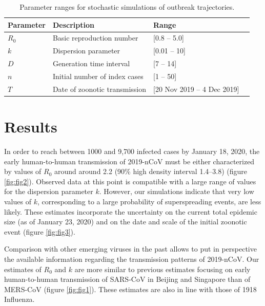 \documentclass{article}
\begin{document}
\begin{table}
	\centering
	\caption{Parameter ranges for stochastic simulations of outbreak trajectories.}
	\label{fig:tab1}
\begin{tabular}{llll}
	\hline
	Parameter & Description & Range   \\
	\hline 
	$R_0$& Basic reproduction number  &[0.8 -- 5.0] \\ 
	$k$ & Dispersion parameter & [0.01 -- 10] \\
	$D$ & Generation time interval & [7 -- 14]  \\
	$n$ & Initial number of index cases & [1 -- 50]  \\
	$T$ & Date of zoonotic transmission & [20 Nov 2019 -- 4 Dec 2019] \\
	
	\hline 
\end{tabular} 
\end{table}

\section{Results}
In order to reach between 1000 and 9,700 infected cases by January 18, 2020, the early human-to-human transmission of 2019-nCoV must be either characterized by values of $R_0$ around around 2.2 (90\% high density interval 1.4--3.8) (figure \ref{fig:fig2}).
Observed data at this point is compatible with a large range of values for the dispersion parameter $k$. 
However, our simulations indicate that very low values of $k$, corresponding to a large probability of superspreading events, are less likely.
These estimates incorporate the uncertainty on the current total epidemic size (as of January 23, 2020) and on the date and scale of the initial zoonotic event (figure \ref{fig:fig3}).

Comparison with other emerging viruses in the past allows to put in perspective the available information regarding the transmission patterns of 2019-nCoV.
Our estimates of $R_0$ and $k$ are more similar to previous estimates focusing on early human-to-human transmission of SARS-CoV in Beijing and Singapore\cite{Lloyd-Smith:2005} than of MERS-CoV\cite{Kucharski:2015b} (figure \ref{fig:fig1}).
These estimates are also in line with those of 1918 Influenza.\cite{Fraser:2011}


\end{document}
